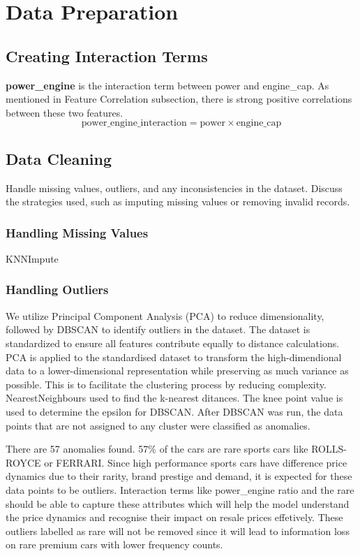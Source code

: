 \documentclass[conference]{IEEEtran}
\begin{document}
\section{Data Preparation}
\label{subsec:data_preprocessing}
\subsection{Creating Interaction Terms}
\textbf{power\_engine} is the interaction term between power and engine\_cap. As mentioned in Feature Correlation subsection, there is strong positive correlations between these two features.
\begin{equation}
    \text{power\_engine\_interaction} = \text{power} \times \text{engine\_cap}
\end{equation}


\subsection{Data Cleaning}
Handle missing values, outliers, and any inconsistencies in the dataset. Discuss the strategies used, such as imputing missing values or removing invalid records.
\subsubsection{Handling Missing Values}
KNNImpute
\subsubsection{Handling Outliers}
We utilize Principal Component Analysis (PCA) to reduce dimensionality, followed by DBSCAN to identify outliers in the dataset.
The dataset is standardized to ensure all features contribute equally to distance calculations. 
PCA is applied to the standardised dataset to transform the high-dimendional data to a lower-dimensional representation while preserving as much variance as possible. This is to facilitate the clustering process by reducing complexity.
NearestNeighbours used to find the k-nearest ditances. The knee point value is used to determine the epsilon for DBSCAN.
After DBSCAN was run, the data points that are not assigned to any cluster were classified as anomalies. 


There are 57 anomalies found. 57\% of the cars are rare sports cars like ROLLS-ROYCE or FERRARI. Since high performance sports cars have difference price dynamics due to their rarity, brand prestige and demand, it is expected for these data points to be outliers. 
Interaction terms like power\_engine ratio and the rare should be able to capture these attributes which will help the model understand the price dynamics and recognise their impact on resale prices effetively.
These outliers labelled as rare will not be removed since it will lead to information loss on rare premium cars with lower frequency counts.
\end{document}
